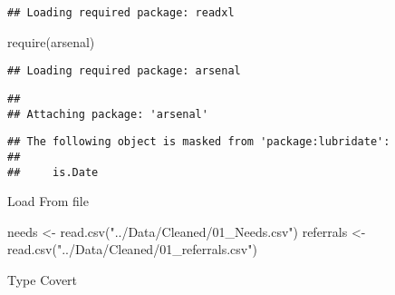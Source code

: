 \documentclass[
]{article}
\newenvironment{Shaded}{\begin{snugshade}}{\end{snugshade}}
\newcommand{\FunctionTok}[1]{\textcolor[rgb]{0.00,0.00,0.00}{#1}}
\newcommand{\NormalTok}[1]{#1}
\newcommand{\OtherTok}[1]{\textcolor[rgb]{0.56,0.35,0.01}{#1}}
\newcommand{\StringTok}[1]{\textcolor[rgb]{0.31,0.60,0.02}{#1}}
\begin{document}
\begin{verbatim}
## Loading required package: readxl
\end{verbatim}

\begin{Shaded}
\begin{Highlighting}[]
\FunctionTok{require}\NormalTok{(arsenal)}
\end{Highlighting}
\end{Shaded}

\begin{verbatim}
## Loading required package: arsenal
\end{verbatim}

\begin{verbatim}
## 
## Attaching package: 'arsenal'
\end{verbatim}

\begin{verbatim}
## The following object is masked from 'package:lubridate':
## 
##     is.Date
\end{verbatim}

Load From file

\begin{Shaded}
\begin{Highlighting}[]
\NormalTok{needs }\OtherTok{\textless{}{-}} \FunctionTok{read.csv}\NormalTok{(}\StringTok{"../Data/Cleaned/01\_Needs.csv"}\NormalTok{)}
\NormalTok{referrals }\OtherTok{\textless{}{-}} \FunctionTok{read.csv}\NormalTok{(}\StringTok{"../Data/Cleaned/01\_referrals.csv"}\NormalTok{)}
\end{Highlighting}
\end{Shaded}

Type Covert
\end{document}
